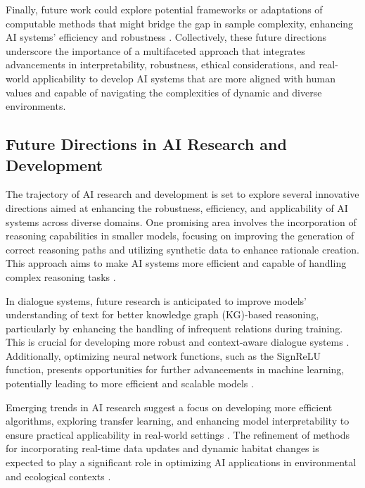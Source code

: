 Finally, future work could explore potential frameworks or adaptations of computable methods that might bridge the gap in sample complexity, enhancing AI systems' efficiency and robustness \cite{ryabko2005samplecomplexitycomputationalpattern}. Collectively, these future directions underscore the importance of a multifaceted approach that integrates advancements in interpretability, robustness, ethical considerations, and real-world applicability to develop AI systems that are more aligned with human values and capable of navigating the complexities of dynamic and diverse environments.



\subsection{Future Directions in AI Research and Development} \label{subsec:Future Directions in AI Research and Development}

The trajectory of AI research and development is set to explore several innovative directions aimed at enhancing the robustness, efficiency, and applicability of AI systems across diverse domains. One promising area involves the incorporation of reasoning capabilities in smaller models, focusing on improving the generation of correct reasoning paths and utilizing synthetic data to enhance rationale creation. This approach aims to make AI systems more efficient and capable of handling complex reasoning tasks \cite{wei2022chain}.



In dialogue systems, future research is anticipated to improve models' understanding of text for better knowledge graph (KG)-based reasoning, particularly by enhancing the handling of infrequent relations during training. This is crucial for developing more robust and context-aware dialogue systems \cite{chaudhuri2021groundingdialoguesystemsknowledge}. Additionally, optimizing neural network functions, such as the SignReLU function, presents opportunities for further advancements in machine learning, potentially leading to more efficient and scalable models \cite{li2023signreluneuralnetworkapproximation}.



Emerging trends in AI research suggest a focus on developing more efficient algorithms, exploring transfer learning, and enhancing model interpretability to ensure practical applicability in real-world settings \cite{shanks2004speculationgraphcomputationarchitectures}. The refinement of methods for incorporating real-time data updates and dynamic habitat changes is expected to play a significant role in optimizing AI applications in environmental and ecological contexts \cite{fluschnik2024placinggreenbridgesoptimally}.



